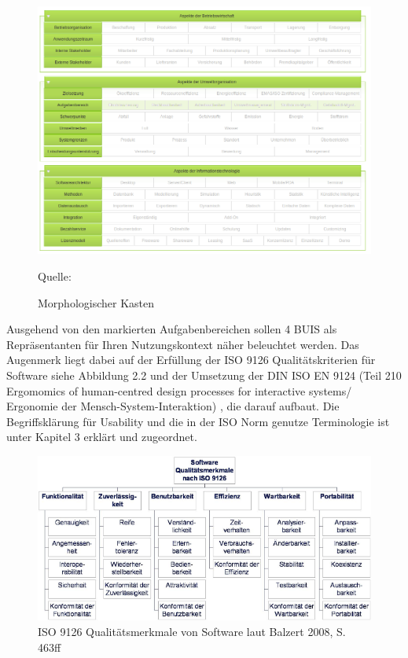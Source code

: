 \documentclass[a4paper, 12pt, twoside, BCOR=20mm, DIV=calc, abstracton, parskip=half*, toc=bibliography, toc=listof, headsepline, footsepline, headings=small, numbers=enddot]{scrreprt}
\newcommand*{\quelle}{%
  \footnotesize Quelle: 
}
\begin{document}
	\begin{figure}[h!]
		\includegraphics[width=\textwidth]{Bild/Morphologischer_Kasten_BUIS_Talus.png}
		\caption{Morphologischer Kasten}
		\quelle{}
	\end{figure}
	
	Ausgehend von den markierten Aufgabenbereichen sollen 4 \ac{BUIS} als Repräsentanten für Ihren Nutzungskontext näher beleuchtet werden. Das Augenmerk liegt dabei auf der Erfüllung der ISO 9126 Qualitätskriterien für Software\cite[S.463ff]{balzert2009lehrbuch} siehe Abbildung 2.2  und der Umsetzung der DIN ISO EN 9124 (Teil 210 Ergomomics of human-centred design processes for interactive systems/ Ergonomie der Mensch-System-Interaktion) \cite{ISO9241}, die darauf aufbaut. Die Begriffsklärung für Usability und die in der ISO Norm genutze Terminologie ist unter Kapitel 3 erklärt und zugeordnet. 
	\begin{figure}[ht]
		\centering
		\includegraphics[width=\textwidth]{Bild/ISO 9126 WI Balzert S463ff.png}
		\caption[ISO 9126 Qualitätsmerkmale von Software]{ISO 9126 Qualitätsmerkmale von Software laut Balzert 2008, S. 463ff\cite{balzert2009lehrbuch}} 
	\end{figure} 
	
\end{document}
